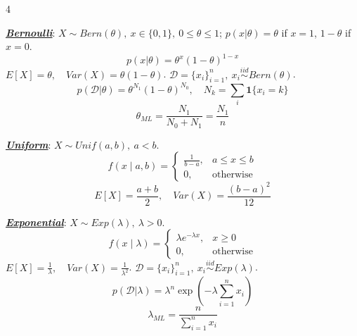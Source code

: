 \documentclass[12pt]{article}
\newcommand{\bulletPoint}[1]{\ul{\textit{\textbf{#1}}}}
\begin{document}
\singlespacing
\begin{multicols*}{4}
\tiny
\raggedright
\bulletPoint{Bernoulli}:
$X\sim Bern(\theta),\ x\in\{0,1\},\ 0\le\theta\le1$; $p(x|\theta)=\theta$ if $x=1$, $1-\theta$ if $x=0$.
\useshortskip \begin{equation*}
    p(x|\theta)=\theta^x(1-\theta)^{1-x}
\end{equation*}
$E[X]=\theta,\quad Var(X)=\theta(1-\theta)$.
$\mathcal{D}=\{x_i\}_{i=1}^n,\ x_i\overset{iid}{\sim}Bern(\theta)$.
\useshortskip \begin{equation*}
    \scriptstyle p(\mathcal{D}|\theta)=\theta^{N_1}(1-\theta)^{N_0},\quad
    N_k=\sum_i\mathbf{1}\{x_i=k\}
\end{equation*}
\useshortskip \begin{equation*}
    \theta_{ML}=\frac{N_1}{N_0+N_1}=\frac{N_1}{n}
\end{equation*}

\bulletPoint{Uniform}:
$X\sim Unif(a,b),\ a<b$.
\useshortskip \begin{equation*}
    f(x\mid a,b)=
    \begin{cases}
        \frac{1}{b-a}, & a\le x\le b\\
        0, & \text{otherwise}
    \end{cases}
\end{equation*}
\useshortskip \begin{equation*}
    E[X]=\frac{a+b}{2},\quad Var(X)=\frac{(b-a)^2}{12}
\end{equation*}

\bulletPoint{Exponential}:
$X\sim Exp(\lambda),\ \lambda>0$.
\useshortskip \begin{equation*}
    f(x\mid\lambda)=
    \begin{cases}
        \lambda e^{-\lambda x}, & x\ge0\\
        0, & \text{otherwise}
    \end{cases}
\end{equation*}
$E[X]=\frac{1}{\lambda},\quad Var(X)=\frac{1}{\lambda^2}$.
$\mathcal{D}=\{x_i\}_{i=1}^n,\ x_i\overset{iid}{\sim}Exp(\lambda)$.
\useshortskip \begin{equation*}
    p(\mathcal{D}|\lambda)=\lambda^n\exp\!\left(-\lambda\sum_{i=1}^n x_i\right)
\end{equation*}
\useshortskip \begin{equation*}
    \lambda_{ML}=\frac{n}{\sum_{i=1}^n x_i}
\end{equation*}


\end{multicols*}
\end{document}

